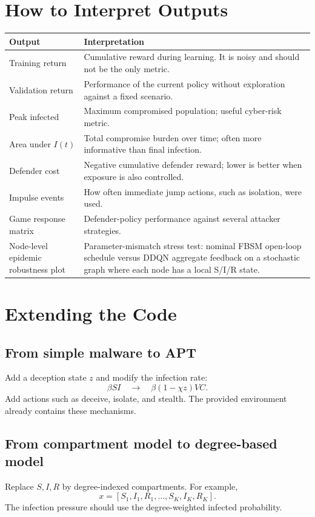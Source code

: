 \documentclass[11pt,a4paper]{article}
\begin{document}
\section{How to Interpret Outputs}
\begin{longtable}{p{}p{}}
\toprule
Output & Interpretation \\
\midrule
Training return & Cumulative reward during learning. It is noisy and should not be the only metric. \\
Validation return & Performance of the current policy without exploration against a fixed scenario. \\
Peak infected & Maximum compromised population; useful cyber-risk metric. \\
Area under $I(t)$ & Total compromise burden over time; often more informative than final infection. \\
Defender cost & Negative cumulative defender reward; lower is better when exposure is also controlled. \\
Impulse events & How often immediate jump actions, such as isolation, were used. \\
Game response matrix & Defender-policy performance against several attacker strategies. \\
Node-level epidemic robustness plot & Parameter-mismatch stress test: nominal FBSM open-loop schedule versus DDQN aggregate feedback on a stochastic graph where each node has a local S/I/R state. \\
\bottomrule
\end{longtable}

\section{Extending the Code}
\subsection{From simple malware to APT}
Add a deception state $z$ and modify the infection rate:
\begin{equation}
\beta SI\quad \rightarrow\quad \beta(1-\chi z)VC.
\end{equation}
Add actions such as deceive, isolate, and stealth. The provided environment already contains these mechanisms.

\subsection{From compartment model to degree-based model}
Replace $S,I,R$ by degree-indexed compartments. For example,
\begin{equation}
x=[S_1,I_1,R_1,\ldots,S_K,I_K,R_K].
\end{equation}
The infection pressure should use the degree-weighted infected probability.
\end{document}
